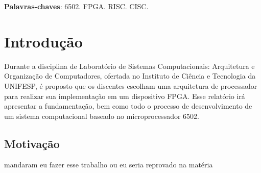 \documentclass[
	12pt,				  %
	openright,		%
	a4paper,			%
	english,			%
	french,				%
	spanish,			%
	brazil,				%
]{abntex2}
\begin{document}

\frenchspacing


\imprimircapa

\imprimirfolhaderosto*

\setlength{\absparsep}{18pt} %
\begin{resumo}


	\noindent
	\textbf{Palavras-chaves}: 6502. FPGA. RISC. CISC.
\end{resumo}



\listoffigures*
\clearpage

\listoftables*
\clearpage


\tableofcontents*


\textual

\chapter{Introdução}
Durante a disciplina de Laboratório de Sistemas Computacionais:
Arquitetura e Organização de Computadores, ofertada no Instituto de Ciência
e Tecnologia da UNIFESP, é proposto que os discentes
escolham uma arquitetura de processador para realizar sua implementação em um
dispositivo FPGA. Esse relatório irá apresentar a fundamentação, bem como todo
o processo de desenvolvimento de um sistema computacional baseado no
microprocessador 6502.


\section{Motivação}
mandaram eu fazer esse trabalho ou eu seria reprovado na matéria
\end{document}
